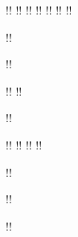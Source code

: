 

!\titulo{}!
!\subtitulo{}!
!\titleabstract{}!
!\autor{}!
!\autorcitacao{}! %
!\local{}!
!\data{}!

!\projeto{}!

!\tituloAcademico{}!

!\areaconcentracao{}!
!\linhapesquisa{}!

!\instituicao{}!

!\newcommand\instituicaosigla{}!
!\newcommand\instituicaocampus{}!
!\departamento{}!
!\programa{}!

!\newcommand\programanivel{}!

!\orientador{}!

!\coorientador{}!



